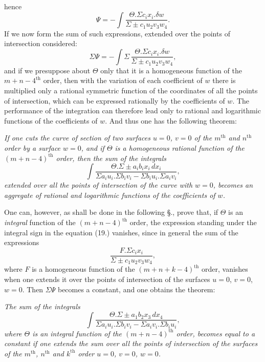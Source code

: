 \documentclass{article}
\begin{document}
hence
\[
\Psi = -\int \frac{\Theta.\Sigma c_{i}x_{i}.\delta w}{\Sigma\pm c_{1}u_{2}v_{3}w_{4}}.
\]
If we now form the sum of such expressions, extended over the points of intersection considered:
\[
\Sigma\Psi = -\int\Sigma\,\frac{\Theta.\Sigma c_{i}x_{i}.\delta w}{\Sigma\pm c_{1}u_{2}v_{3}w_{4}}, \tag{19.}
\]
and if we presuppose about $\Theta$ only that it is a homogeneous function of the $m+n-4^{\text{th}}$ order, then with the variation of each coefficient of $w$ there is multiplied only a rational symmetric function of the coordinates of all the points of intersection, which can be expressed rationally by the coefficients of $w$. The performance of the integration can therefore lead only to rational and logarithmic functions of the coefficients of $w$. And thus one has the following theorem:

\emph{If one cuts the curve of section of two surfaces $u=0$, $v=0$ of the $m^{\text{th}}$ and $n^{\text{th}}$ order by a surface $w=0$, and if $\Theta$ is a homogeneous rational function of the $(m+n-4)^{\text{th}}$ order, then the sum of the integrals}
\[
\int \frac{\Theta.\Sigma\pm a_{i}b_{i}x_{i}\,dx_{i}}{\Sigma a_{i}u_{i}.\Sigma b_{i}v_{i} - \Sigma b_{i}u_{i}.\Sigma a_{i}v_{i}},
\]
\emph{extended over all the points of intersection of the curve with $w=0$, becomes an aggregate of rational and logarithmic functions of the coefficients of $w$.}

One can, however, as shall be done in the following §., prove that, if $\Theta$ is an \emph{integral} function of the $(m+n-4)^{\text{th}}$ order, the expression standing under the integral sign in the equation (19.) vanishes, since in general the sum of the expressions
\[
\frac{F.\Sigma c_{i}x_{i}}{\Sigma\pm c_{1}u_{2}v_{3}w_{4}},
\]
where $F$ is a homogeneous function of the $(m+n+k-4)^{\text{th}}$ order, vanishes when one extends it over the points of intersection of the surfaces $u=0$, $v=0$, $w=0$. Then $\Sigma\Psi$ becomes a constant, and one obtains the theorem:

\emph{The sum of the integrals}
\[
\int \frac{\Theta.\Sigma\pm a_{1}b_{2}x_{3}\,dx_{4}}{\Sigma a_{i}u_{i}.\Sigma b_{i}v_{i} - \Sigma a_{i}v_{i}.\Sigma b_{i}u_{i}},
\]
\emph{where $\Theta$ is an integral function of the $(m+n-4)^{\text{th}}$ order, becomes equal to a constant if one extends the sum over all the points of intersection of the surfaces of the $m^{\text{th}}$, $n^{\text{th}}$ and $k^{\text{th}}$ order $u=0$, $v=0$, $w=0$.}
\end{document}
